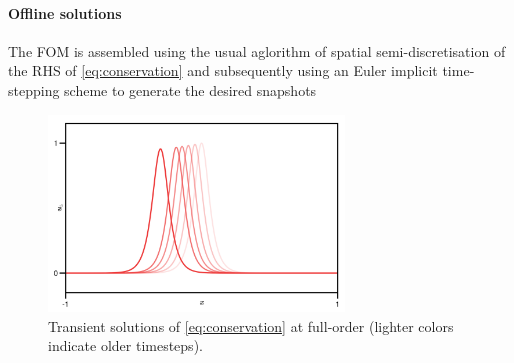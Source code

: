 \documentclass[../main.tex]{subfiles}
\begin{document}
\paragraph{Offline solutions}\label{par:conservation_fom}

The FOM is assembled using the usual aglorithm of spatial semi-discretisation of the RHS of \eqref{eq:conservation} and subsequently using an Euler implicit time-stepping scheme to generate the desired snapshots

\begin{figure}[H]
    \centering 
    \includegraphics[keepaspectratio, width=0.7\textwidth]{../figures/fig:conservation_fom.png}
    \caption{Transient solutions of \eqref{eq:conservation} at full-order (lighter colors indicate older timesteps).}
    \label{fig:conservation_fom}
\end{figure}
\end{document}
